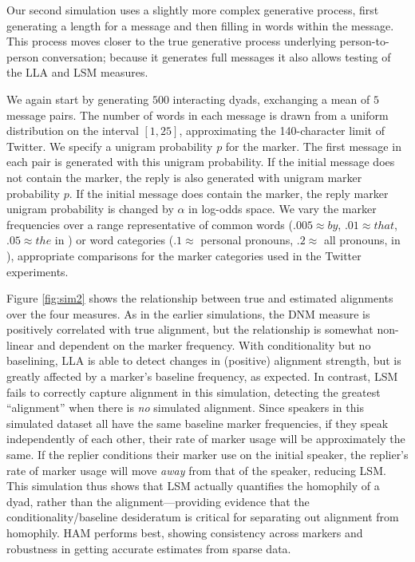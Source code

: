 \documentclass{acm_proc_article-sp}
\begin{document}
Our second simulation uses a slightly more complex generative process, first generating a length for a message and then filling in words within the message. This process moves closer to the true generative process underlying person-to-person conversation; because it generates full messages it also allows testing of the LLA and LSM measures.

We again start by generating $500$ interacting dyads, exchanging a mean of $5$ message pairs. The number of words in each message is drawn from a uniform distribution on the interval $[1,25]$, approximating the 140-character limit of Twitter. We specify a unigram probability $p$ for the marker. The first message in each pair is generated with this unigram probability.  If the initial message does not contain the marker, the reply is also generated with unigram marker probability $p$. If the initial message does contain the marker, the reply marker unigram probability is changed by $\alpha$ in log-odds space.  We vary the marker frequencies over a range representative of common words ($.005 \approx by$, $.01 \approx that$, $.05 \approx the$ in \cite{Brown}) or word categories ($.1 \approx $ personal pronouns, $.2 \approx $ all pronouns, in \cite{KacewiczEtAl2013}), appropriate comparisons for the marker categories used in the Twitter experiments.

Figure \ref{fig:sim2} shows the relationship between true and estimated alignments over the four measures. As in the earlier simulations, the DNM measure is positively correlated with true alignment, but the relationship is somewhat non-linear and dependent on the marker frequency.  With conditionality but no baselining, LLA is able to detect changes in (positive) alignment strength, but is greatly affected by a marker's baseline frequency, as expected. In contrast, LSM fails to correctly capture alignment in this simulation, detecting the greatest ``alignment'' when there is \emph{no} simulated alignment. Since speakers in this simulated dataset all have the same baseline marker frequencies, if they speak independently of each other, their rate of marker usage will be approximately the same. If the replier conditions their marker use on the initial speaker, the replier's rate of marker usage will move \emph{away} from that of the speaker, reducing LSM.  This simulation thus shows that LSM actually quantifies the homophily of a dyad, rather than the alignment---providing evidence that the conditionality/baseline desideratum is critical for separating out alignment from homophily. HAM performs best, showing consistency across markers and robustness in getting accurate estimates from sparse data. 
\end{document}

